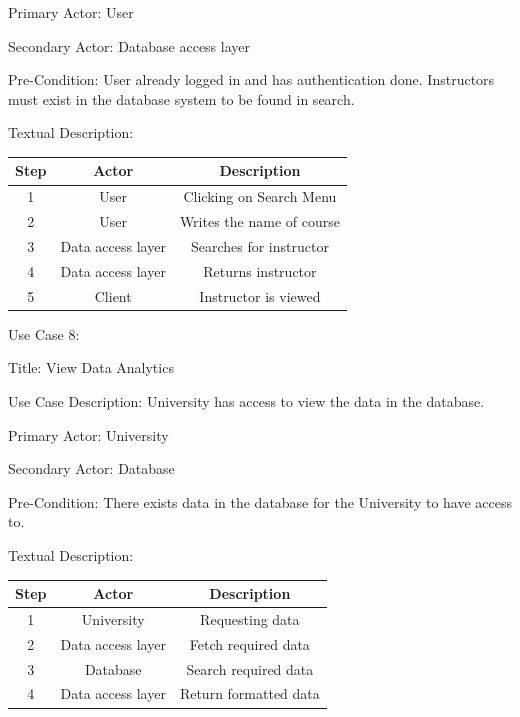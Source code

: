 \documentclass{article}
\begin{document}
	Primary Actor: User

	Secondary Actor: Database access layer

Pre-Condition: User already logged in and has authentication done. Instructors must exist in the database system to be found in search.

	Textual Description:





\begin{center}
  \begin{tabular}{|c|c|c|}
    \hline
    Step & 
    Actor & 
Description \\ \hline 

    1 & 
    User &
Clicking on Search Menu \\
    2 &
    User &
Writes the name of course \\
    3 &
    Data access layer &
Searches for instructor \\
    4 &
    Data access layer &
Returns instructor \\
    5 &
    Client  &
Instructor is viewed \\ \hline


  \end{tabular} 
\end{center}


Use Case 8: 

	Title: View Data Analytics

	Use Case Description: University has access to view the data in the database.

	Primary Actor: University

	Secondary Actor: Database

Pre-Condition: There exists data in the database for the University to have access to.

	Textual Description:


\begin{center}
  \begin{tabular} {|c|c|c|}
    \hline
    Step&
    Actor&
Description \\ \hline
    1&
    University &
Requesting data \\
    2&
    Data access layer &
Fetch required data\\ 
    3&
    Database &
Search required data \\
    4 &
    Data access layer &
Return formatted data \\ \hline


  \end{tabular} 
\end{center}
\end{document}
